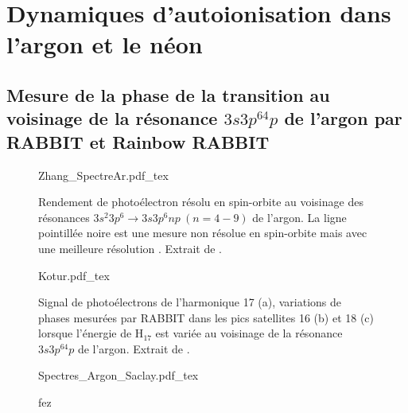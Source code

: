 \part{Dynamiques d'autoionisation dans l'argon et le néon}
\label{part:Argon}




\chapter[Mesure de la phase de la transition au voisinage de la résonance $3s3p^64p$ de l'argon par RABBIT et Rainbow RABBIT]{Mesure de la phase de la transition au voisinage de la résonance \MakeLowercase{$3s3p^64p$} de l'argon par RABBIT et Rainbow RABBIT}

\begin{figure}
\centering
\def\svgwidth{0.85\textwidth}
{Zhang_SpectreAr.pdf_tex}
\caption{Rendement de photoélectron résolu en spin-orbite au voisinage des résonances $3s^2 3p^6 \rightarrow 3s 3p^6 np \: (n = 4 - 9) $ de l'argon. La ligne pointillée noire est une mesure non résolue en spin-orbite mais avec une meilleure résolution . Extrait de .}
\label{fig:Zhang_SpectreAr}
\end{figure}

\begin{figure}
\centering
\def\svgwidth{0.5\textwidth}
{Kotur.pdf_tex}
\caption{Signal de photoélectrons de l'harmonique 17 (a), variations de phases mesurées par RABBIT dans les pics satellites 16 (b) et 18 (c) lorsque l'énergie de H$_{17}$ est variée au voisinage de la résonance $3s3p^64p$ de l'argon. Extrait de .}
\label{fig:Kotur}
\end{figure}

\begin{figure}
\centering
\def\svgwidth{1\textwidth}
{Spectres_Argon_Saclay.pdf_tex}
\caption{fez}
\label{fig:Spectres_Argon_Saclay}
\end{figure}


